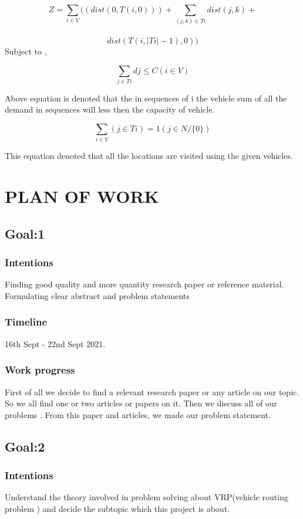 \documentclass[conference]{IEEEtran}
\begin{document}
$$ Z = \sum\limits_{i \in V}{((dist(0, T(i,0))) + \sum\limits_{(j, k) \in Ti}{dist(j, k)} + }$$ \\$${dist(T(i, |Ti| - 1),0))} $$
Subject to ,

$$  \sum\limits_{j \in Ti}{dj \leq C (i \in V)} $$

Above equation is denoted that the in sequences of i the vehicle sum of all the demand in sequences will less then the capacity of vehicle.

$$  \sum\limits_{i \in V}{(j \in Ti)} = 1 (j \in N / \{0\}) $$

This equation denoted that all the locations are visited using the given vehicles.

\vspace{10}

\section{{\textbf{PLAN OF WORK}}}
\subsection{{\textbf{Goal:1}}}
\subsubsection{{\textbf{Intentions}}}
 Finding good quality and more quantity research paper or reference  material.  Formulating clear abstract and problem statements  \\
\subsubsection{{\textbf{Timeline}}}
16th Sept -  22nd Sept 2021. \\
\subsubsection{{\textbf{Work progress}}}
First of all we decide to find a relevant research paper or any article on our topic. So we all find one or two articles or papers on it. Then we discuss all of our problems . From this paper and articles, we made our problem statement.


\subsection{{\textbf{Goal:2}}}

\subsubsection{{\textbf{Intentions}}}
Understand the theory involved in problem solving about VRP(vehicle routing problem ) and decide the subtopic which this project is about. \\
\end{document}
